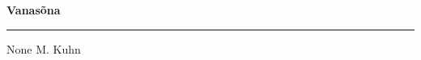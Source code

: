 \documentclass[10pt]{book}
\begin{document}
{
  \samepage
  \raggedbottom
  \raggedright
  \sloppy


  \vspace{0.2in}

  \noindent\begin{minipage}{.1\textwidth}
    \hfill\vspace{0.1in}
  \end{minipage}%
  \noindent\begin{minipage}{.8\textwidth}
    \centering
    \bfseries
    \large Vanas\~ona
  \end{minipage}%
  \noindent\begin{minipage}{.1\textwidth}
      \hfill\vspace{0.1in}
  \end{minipage}

  \nopagebreak[4]
  \vspace{0.1in}
  \nopagebreak[4]
  \hrule height 0.05ex
  \nopagebreak[4]
  \vspace{-0.05in}

  {\footnotesize None \hfill M. Kuhn }\\
  \vspace{0.01in}


  \vspace{0.01in}
  \nopagebreak[4]
  {%
\parindent 0pt
\noindent
\ifx\preLilyPondExample \undefined
\else
  \expandafter\preLilyPondExample
\fi
\def\lilypondbook{}%

\ifx\postLilyPondExample \undefined
\else
  \expandafter\postLilyPondExample
\fi
}

}
\end{document}
